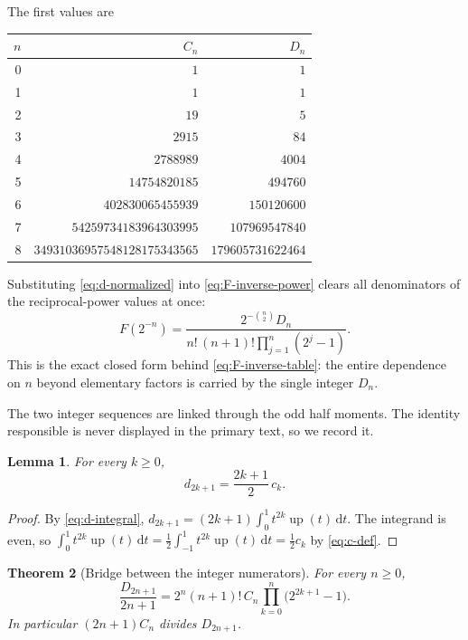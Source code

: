 \documentclass[11pt,oneside]{article}
\newtheorem{theorem}{Theorem}[section]
\newtheorem{lemma}[theorem]{Lemma}
\theoremstyle{definition}
\theoremstyle{remark}
\newcommand{\Up}{\operatorname{up}}
\newcommand{\dd}{\,\mathrm d}
\begin{document}
The first values are
\begin{center}
\begin{tabular}{@{}rrr@{}}
\toprule
$n$ & $C_n$ & $D_n$\\
\midrule
0 & $1$ & $1$\\
1 & $1$ & $1$\\
2 & $19$ & $5$\\
3 & $2915$ & $84$\\
4 & $2788989$ & $4004$\\
5 & $14754820185$ & $494760$\\
6 & $402830065455939$ & $150120600$\\
7 & $54259734183964303995$ & $107969547840$\\
8 & $34931036957548128175343565$ & $179605731622464$\\
\bottomrule
\end{tabular}
\end{center}
Substituting \eqref{eq:d-normalized} into \eqref{eq:F-inverse-power} clears all denominators
of the reciprocal-power values at once:
\begin{equation}
 F(2^{-n})=\frac{2^{-\binom n2}D_n}
 {n!\,(n+1)!\prod_{j=1}^{n}(2^j-1)}.                       \label{eq:mom-F-inverse-D}
\end{equation}
This is the exact closed form behind \eqref{eq:F-inverse-table}: the entire dependence on $n$
beyond elementary factors is carried by the single integer $D_n$.

The two integer sequences are linked through the odd half moments.  The identity responsible
is never displayed in the primary text, so we record it.

\begin{lemma}                                              \label{lem:mom-d-odd-c}
For every $k\ge0$,
\begin{equation}
 d_{2k+1}=\frac{2k+1}{2}\,c_k.                             \label{eq:mom-d-odd-c}
\end{equation}
\end{lemma}

\begin{proof}
By \eqref{eq:d-integral}, $d_{2k+1}=(2k+1)\int_0^1t^{2k}\Up(t)\dd t$.  The integrand is even,
so $\int_0^1t^{2k}\Up(t)\dd t=\tfrac12\int_{-1}^{1}t^{2k}\Up(t)\dd t=\tfrac12c_k$ by
\eqref{eq:c-def}.
\end{proof}

\begin{theorem}[Bridge between the integer numerators]      \label{thm:mom-numerator-bridge}
For every $n\ge0$,
\begin{equation}
 \frac{D_{2n+1}}{2n+1}
 =2^n(n+1)!\,C_n\prod_{k=0}^{n}\bigl(2^{2k+1}-1\bigr).      \label{eq:mom-D-C-bridge}
\end{equation}
In particular $(2n+1)C_n$ divides $D_{2n+1}$.
\end{theorem}
\end{document}
